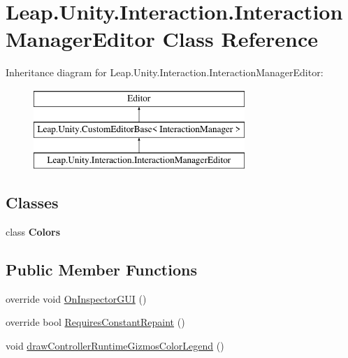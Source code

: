\hypertarget{class_leap_1_1_unity_1_1_interaction_1_1_interaction_manager_editor}{}\section{Leap.\+Unity.\+Interaction.\+Interaction\+Manager\+Editor Class Reference}
\label{class_leap_1_1_unity_1_1_interaction_1_1_interaction_manager_editor}
Inheritance diagram for Leap.\+Unity.\+Interaction.\+Interaction\+Manager\+Editor\+:\begin{figure}[H]
\begin{center}
\leavevmode
\includegraphics[height=3.000000cm]{class_leap_1_1_unity_1_1_interaction_1_1_interaction_manager_editor}
\end{center}
\end{figure}
\subsection*{Classes}
\begin{DoxyCompactItemize}
\item 
class {\bfseries Colors}
\end{DoxyCompactItemize}
\subsection*{Public Member Functions}
\begin{DoxyCompactItemize}
\item 
override void \mbox{\hyperlink{class_leap_1_1_unity_1_1_interaction_1_1_interaction_manager_editor_aa72499eea4104ced9f3697918162f100}{On\+Inspector\+G\+UI}} ()
\item 
override bool \mbox{\hyperlink{class_leap_1_1_unity_1_1_interaction_1_1_interaction_manager_editor_a874c2b8aa6579b0ecaf9670da4b36c3e}{Requires\+Constant\+Repaint}} ()
\item 
void \mbox{\hyperlink{class_leap_1_1_unity_1_1_interaction_1_1_interaction_manager_editor_a58578d667041a887d24fd2581df9d335}{draw\+Controller\+Runtime\+Gizmos\+Color\+Legend}} ()
\end{DoxyCompactItemize}
